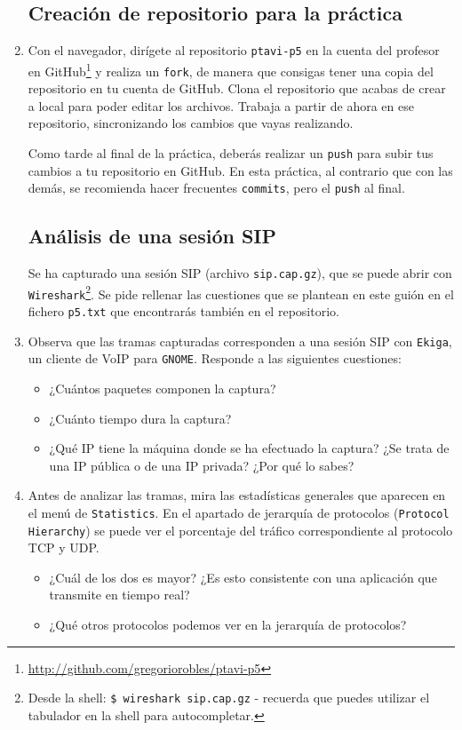 \documentclass[11pt,a4paper]{article}
\begin{document}
\begin{enumerate}

\subsection*{Creación de repositorio para la práctica}

  \item Con el navegador, dirígete al repositorio \texttt{ptavi-p5} en la cuenta del profesor en GitHub\footnote{\url{http://github.com/gregoriorobles/ptavi-p5}} y realiza un \texttt{fork}, de manera que consigas tener una copia del repositorio en tu cuenta de GitHub. Clona el repositorio que acabas de crear a local para poder editar los archivos. Trabaja a partir de ahora en ese repositorio, sincronizando los cambios que vayas realizando.

  Como tarde al final de la práctica, deberás realizar un \texttt{push} para subir tus cambios a tu repositorio en GitHub. En esta práctica, al contrario que con las demás, se recomienda hacer frecuentes \texttt{commits}, pero el \texttt{push} al final.


\subsection*{Análisis de una sesión SIP}

Se ha capturado una sesión SIP (archivo \texttt{sip.cap.gz}), que se puede abrir con \texttt{Wireshark}\footnote{Desde la shell: \texttt{\$ wireshark sip.cap.gz} - recuerda que puedes utilizar el tabulador en la shell para autocompletar.}. Se pide rellenar las cuestiones que se plantean en este guión en el fichero \texttt{p5.txt} que encontrarás también en el repositorio. 

  \item Observa que las tramas capturadas corresponden a una sesión SIP con \texttt{Ekiga}, un cliente de VoIP para \texttt{GNOME}. Responde a las siguientes cuestiones:
  \begin{itemize}
    \item ¿Cuántos paquetes componen la captura?
    \item ¿Cuánto tiempo dura la captura?
    \item ¿Qué IP tiene la máquina donde se ha efectuado la captura? ¿Se trata de una IP pública o de una IP privada? ¿Por qué lo sabes?
  \end{itemize}

  \item Antes de analizar las tramas, mira las estadísticas generales que aparecen en el menú de \texttt{Statistics}. En el apartado de jerarquía de protocolos (\texttt{Protocol Hierarchy}) se puede ver el porcentaje del tráfico correspondiente al protocolo TCP y UDP.
  \begin{itemize}
    \item ¿Cuál de los dos es mayor? ¿Es esto consistente con una aplicación que transmite en tiempo real? 
    \item ¿Qué otros protocolos podemos ver en la jerarquía de protocolos?
  \end{itemize}


\end{enumerate}
\end{document}
